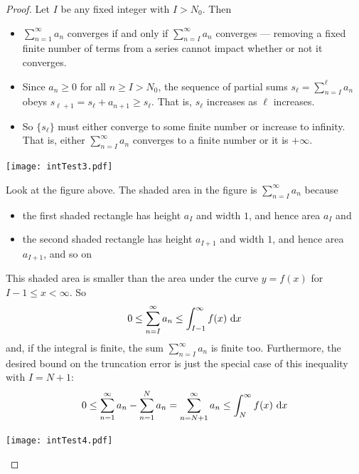 \begin{proof}
Let $I$ be any fixed integer with $I>N_0$. Then
\begin{itemize}
\item
$\sum_{n=1}^\infty a_n$ converges if and only if
$\sum_{n=I}^\infty a_n$ converges --- removing a fixed finite number
of terms from a series cannot impact whether or not it converges.
\item
Since $a_n\ge 0$ for all $n\ge I>N_0$, the sequence of partial sums
$s_\ell=\sum_{n=I}^\ell a_n$ obeys $s_{\ell+1} = s_\ell+a_{n+1}
\ge s_\ell$. That is, $s_\ell$ increases as $\ell$ increases.
\item
So $\big\{s_\ell\big\}$ must either
converge to some finite number or increase to infinity. That is, either
$\sum_{n=I}^\infty a_n$ converges to a finite number or it is $+\infty$.
\end{itemize}
\begin{efig}
\begin{center}
     \texttt{[image: intTest3.pdf]}
\end{center}
\end{efig}

Look at the figure above. The shaded area in the figure is
$\sum_{n=I}^\infty a_n$ because
\begin{itemize}\itemsep1pt \parskip0pt  %
\item the first shaded rectangle has height $a_I$
and width $1$, and hence area $a_I$ and
\item the second shaded rectangle has height $a_{I+1}$
and width $1$, and hence area $a_{I+1}$, and so on
\end{itemize}
This shaded area is smaller than the area under the curve $y=f(x)$ for
$I-1\le x<\infty$. So
\begin{equation*}
0\le \sum_{n=I}^\infty a_n
\le \int_{I-1}^\infty f(x)\ \mathrm{d}x
\end{equation*}
and, if the integral is finite, the sum $\sum_{n=I}^\infty a_n$ is
finite too.
Furthermore, the desired bound on the truncation error is just
the special case of this inequality with $I=N+1$:
\begin{align*}
0\le \sum_{n=1}^\infty a_n - \sum_{n=1}^N a_n
=\sum_{n=N+1}^\infty a_n
\le \int_N^\infty f(x)\ \mathrm{d}x
\end{align*}


\begin{efig}
\begin{center}
     \texttt{[image: intTest4.pdf]}
\end{center}
\end{efig}


\end{proof}
